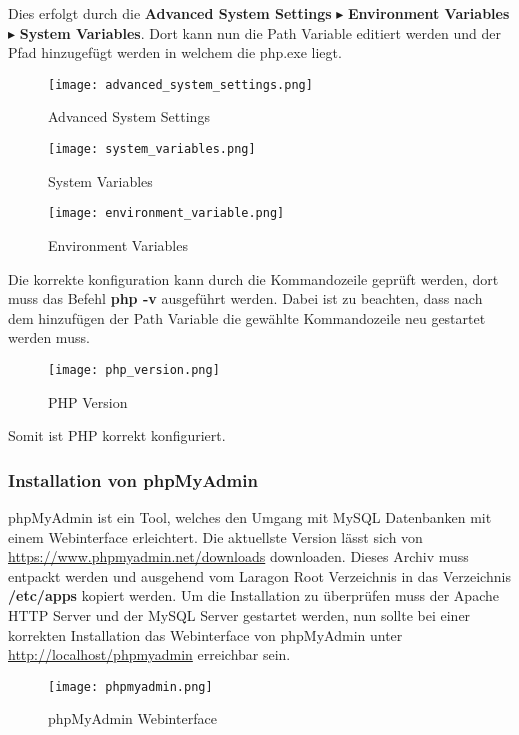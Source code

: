 Dies erfolgt durch die \textbf{Advanced System Settings} $\blacktriangleright$
\textbf{Environment Variables} $\blacktriangleright$ \textbf{System Variables}.
Dort kann nun die Path Variable editiert werden und der Pfad hinzugefügt werden
in welchem die php.exe liegt.

\begin{figure}[H]
  \centering
  \texttt{[image: advanced\_system\_settings.png]}
  \caption{Advanced System Settings}
\end{figure}

\begin{figure}[H]
  \centering
  \texttt{[image: system\_variables.png]}
  \caption{System Variables}
\end{figure}

\begin{figure}[H]
  \centering
  \texttt{[image: environment\_variable.png]}
  \caption{Environment Variables}
\end{figure}

Die korrekte konfiguration kann durch die Kommandozeile geprüft werden, dort
muss das Befehl \textbf{php -v} ausgeführt werden. Dabei ist zu beachten, dass
nach dem hinzufügen der Path Variable die gewählte Kommandozeile neu gestartet
werden muss.

\begin{figure}[H]
  \centering
  \texttt{[image: php\_version.png]}
  \caption{PHP Version}
\end{figure}

Somit ist PHP korrekt konfiguriert.

\subsubsection{Installation von phpMyAdmin}
phpMyAdmin ist ein Tool, welches den Umgang mit MySQL Datenbanken mit einem
Webinterface erleichtert. Die aktuellste Version lässt sich von
\url{https://www.phpmyadmin.net/downloads} downloaden. Dieses Archiv muss
entpackt werden und ausgehend vom Laragon Root Verzeichnis in das Verzeichnis
\textbf{/etc/apps} kopiert werden. Um die Installation zu überprüfen muss der
Apache HTTP Server und der MySQL Server gestartet werden, nun sollte bei einer
korrekten Installation das Webinterface von phpMyAdmin unter
\url{http://localhost/phpmyadmin} erreichbar sein.

\begin{figure}[H]
  \centering
  \texttt{[image: phpmyadmin.png]}
  \caption{phpMyAdmin Webinterface}
\end{figure}

